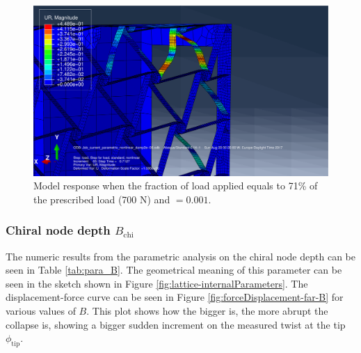       \begin{figure}[!htpb] %
        \centering
        \includegraphics[width=0.7 \textwidth]{figures/../figures/result-sim/eccen/0coma001_UR}
        \caption[Model response when the fraction of load applied equals to 71\% of the prescribed load (700 N) and \chie$= 0.001$]{Model response when the fraction of load applied equals to 71\% of the prescribed load (700 N) and \chie$= 0.001$.}
        \label{fig:0coma001_UR}
      \end{figure}

    \clearpage
    \subsubsection{Chiral node depth $B_{\mathrm{chi}}$}

      The numeric results from the parametric analysis on the chiral node depth \chiB can be seen in Table \ref{tab:para_B}. The geometrical meaning of this parameter can be seen in the sketch shown in Figure \ref{fig:lattice-internalParameters}. The displacement-force curve can be seen in Figure \ref{fig:forceDisplacement-far-B} for various values of $B$. This plot shows how the bigger \chiB is, the more abrupt the collapse is, showing a bigger sudden increment on the measured twist at the tip $\phi_{\mathrm{tip}}$.

